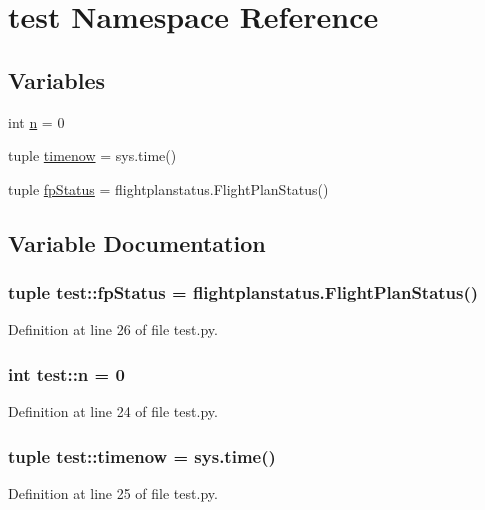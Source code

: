 \hypertarget{namespacetest}{\section{test \-Namespace \-Reference}
\label{namespacetest}
}
\subsection*{\-Variables}
\begin{DoxyCompactItemize}
\item 
int \hyperlink{namespacetest_ad7b3da39549c8b8519497f0346180d05}{n} = 0
\item 
tuple \hyperlink{namespacetest_ac030700ad9974c292dbeccf51cf743fd}{timenow} = sys.\-time()
\item 
tuple \hyperlink{namespacetest_aeab31959d67c11d8de0932732e1861d1}{fp\-Status} = flightplanstatus.\-Flight\-Plan\-Status()
\end{DoxyCompactItemize}


\subsection{\-Variable \-Documentation}
\hypertarget{namespacetest_aeab31959d67c11d8de0932732e1861d1}{
\subsubsection[{fp\-Status}]{\setlength{\rightskip}{0pt plus 5cm}tuple {\bf test\-::fp\-Status} = flightplanstatus.\-Flight\-Plan\-Status()}}\label{namespacetest_aeab31959d67c11d8de0932732e1861d1}


\-Definition at line 26 of file test.\-py.

\hypertarget{namespacetest_ad7b3da39549c8b8519497f0346180d05}{
\subsubsection[{n}]{\setlength{\rightskip}{0pt plus 5cm}int {\bf test\-::n} = 0}}\label{namespacetest_ad7b3da39549c8b8519497f0346180d05}


\-Definition at line 24 of file test.\-py.

\hypertarget{namespacetest_ac030700ad9974c292dbeccf51cf743fd}{
\subsubsection[{timenow}]{\setlength{\rightskip}{0pt plus 5cm}tuple {\bf test\-::timenow} = sys.\-time()}}\label{namespacetest_ac030700ad9974c292dbeccf51cf743fd}


\-Definition at line 25 of file test.\-py.

